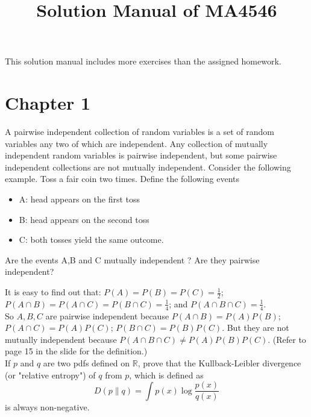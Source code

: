 \documentclass[  11pt]{article}
\newcommand{\Real}{{\mathbb{R}}}
\begin{document}
\title{ Solution  Manual  of MA4546}

 


\maketitle

 This solution manual   includes more   exercises  than the assigned homework.


\section*{Chapter 1}
\begin{ExerciseList}
\Exercise
 A pairwise independent collection of random variables is a set of random variables
any two of which are independent. Any collection of mutually independent
random variables is pairwise independent, but some pairwise independent
collections are not mutually independent. Consider the following example.
Toss a fair coin two times. Define the following events
\begin{itemize}
\item A: head appears on the first toss
\item B: head appears on the second toss
\item C: both tosses yield the same outcome.
\end{itemize}
Are the events A,B and C mutually independent ? Are they pairwise independent?
 
\Answer
It is easy to find out that:
$P(A)=P(B)=P(C)=\frac{1}{2}$; $P(A\cap B) = P(A\cap C) = P(B\cap C) = \frac{1}{4}$; and $P(A\cap B\cap C) = \frac{1}{4}$. \\

So $A, B, C$ are pairwise independent because $P(A\cap B) = P(A)P(B)$; $P(A\cap C) = P(A)P(C)$; $P(B\cap C) = P(B)P(C)$. But they are not mutually independent because $P(A\cap B\cap C) \neq P(A)P(B)P(C)$. (Refer to page 15 in the slide for the definition.)\\


\Exercise[difficulty=4]
 If $p$ and $q$ are two pdfs defined on $\Real$, prove that the Kullback-Leibler
divergence (or "relative entropy") of $q$ from $p$, which is defined as
$$D(p\|q)=\int p(x)\log\frac{p(x)}{q(x)}$$
is always non-negative.


\end{ExerciseList}
\end{document}
